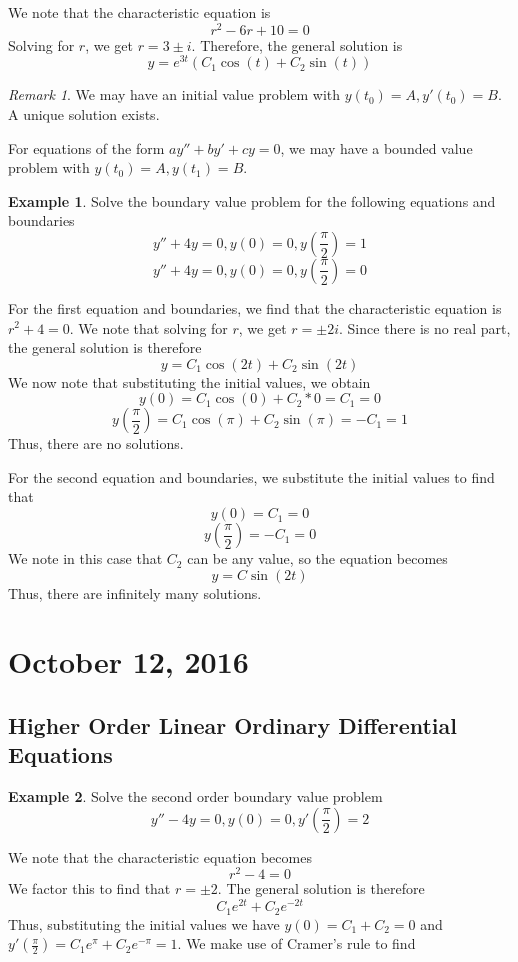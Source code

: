 \documentclass[11pt]{article}
\theoremstyle{plain} %
\theoremstyle{definition}
\theoremstyle{example}
\newtheorem*{example}{Example}
\theoremstyle{remark}
\newtheorem*{remark}{Remark}
\begin{document}
We note that the characteristic equation is $$r^2-6r+10=0$$ Solving for $r$, we get $r = 3\pm i$. Therefore, the general solution is $$y = e^{3t} \left(C_1\cos(t) + C_2\sin(t)\right)$$

\begin{remark}
We may have an initial value problem with $y(t_0) = A, y'(t_0) = B$. A unique solution exists. 
\end{remark}

For equations of the form $ay'' + by' + cy =0$, we may have a bounded value problem with $y(t_0) = A, y(t_1) = B$. 

\begin{example}
	Solve the boundary value problem for the following equations and boundaries
	$$y'' + 4y =0, y(0) = 0, y\left(\frac{\pi}{2}\right) = 1$$
	$$y'' + 4y = 0, y(0) = 0, y\left(\frac{\pi}{2}\right) =0$$
\end{example}

For the first equation and boundaries, we find that the characteristic equation is $r^2+4=0$. We note that solving for $r$, we get $r=\pm 2i$. Since there is no real part, the general solution is therefore 
$$y=C_1\cos(2t) + C_2\sin(2t)$$
We now note that substituting the initial values, we obtain 
$$y(0) = C_1\cos(0) + C_2*0 = C_1 = 0$$
$$y\left(\frac{\pi}{2}\right)  = C_1\cos(\pi) + C_2 \sin(\pi) =- C_1 = 1$$
Thus, there are no solutions.

For the second equation and boundaries, we substitute the initial values to find that
$$y(0) = C_1 = 0$$
$$y\left(\frac{\pi}{2}\right) = -C_1 = 0$$
We note in this case that $C_2$ can be any value, so the equation becomes $$y = C\sin(2 t)$$
Thus, there are infinitely many solutions.

\section{October 12, 2016}
\subsection{Higher Order Linear Ordinary Differential Equations}

\begin{example}
Solve the second order boundary value problem $$y'' -4y = 0, y(0) = 0, y'\left(\frac{\pi}{2}\right) = 2$$
\end{example}
We note that the characteristic equation becomes $$r^2-4=0$$ We factor this to find that $r = \pm 2$. The general solution is therefore 
$$C_1e^{2t} +C_2e^{-2t}$$Thus, substituting the initial values we have $y(0) = C_1 + C_2 = 0$ and $y'\left(\frac{\pi}{2}\right) = C_1e^{\pi} + C_2e^{-\pi} = 1$. We make use of Cramer's rule to find
\end{document}
